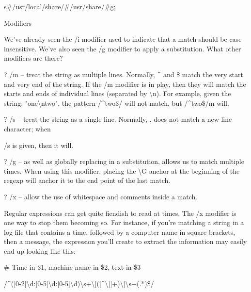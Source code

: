 \documentclass[a4paper,11pt]{book}
\begin{document}
\noindent 

\noindent s\#/usr/local/share/\#/usr/share/\#g;

\noindent 

\noindent 

\noindent Modifiers

\noindent 

\noindent We've already seen the /i modifier used to indicate that a match should be case insensitive. We've also seen the /g modifier to apply a substitution. What other modifiers are there?

\noindent 

\noindent ? /m -- treat the string as multiple lines. Normally, \^{} and \$ match the very start and very end of the string. If the /m modifier is in play, then they will match the starts and ends of individual lines  (separated  by  \textbackslash n).  For  example,  given  the  string:  "one\textbackslash ntwo",  the  pattern  /\^{}two\$/ will not match, but /\^{}two\$/m will.

\noindent 

\noindent ? /s -- treat the string as a single line. Normally, . does not match a new line character; when

\noindent /s is given, then it will.

\noindent 

\noindent ? /g -- as well as globally replacing in a substitution, allows us to match multiple times. When using this modifier, placing the \textbackslash G anchor at the beginning of the regexp will anchor it to the end point of the last match.

\noindent 

\noindent ? /x -- allow the use of whitespace and comments inside a match.

\noindent 

\noindent Regular expressions can get quite fiendish to read at times. The /x modifier is one way to stop them becoming so. For instance, if you're matching a string in a log file that contains a time, followed by a computer name in square brackets, then a message, the expression you'll create to extract the information may easily end up looking like this:

\noindent 

\noindent 

\noindent \# Time in \$1, machine name in \$2, text in \$3

\noindent /\^{}([0-2]\textbackslash d:[0-5]\textbackslash d:[0-5]\textbackslash d)\textbackslash s+\textbackslash [([\^{}\textbackslash ]]+)\textbackslash ]\textbackslash s+(.*)\$/
\end{document}
